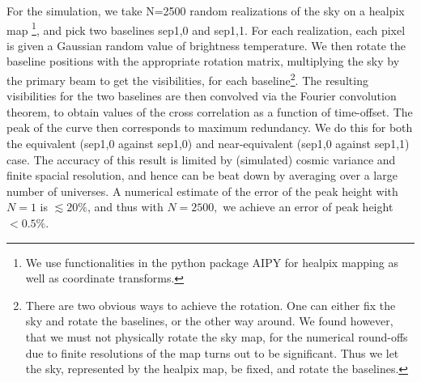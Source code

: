 \documentclass[twocolumn,apj,numberedappendix]{emulateapj}
\renewcommand\[{\begin{equation}}
\renewcommand\]{\end{equation}}
\begin{document}
For the simulation, we take N=2500 random realizations of the sky
on a healpix map \citep{Heal, HealPrimer} \footnote{We use functionalities in the python package AIPY for healpix mapping
as well as coordinate transforms. }, and pick two baselines sep1,0 and sep1,1. For each realization, each pixel is given a Gaussian random value
of brightness temperature. We then rotate the baseline positions with
the appropriate rotation matrix, multiplying the sky by the primary beam to get the visibilities, for each
baseline\footnote{There are two obvious ways to achieve the rotation. One
can either fix the sky and rotate the baselines, or the other way
around. We found however, that we must not physically rotate the sky
map, for the numerical round-offs due to finite resolutions of the
map turns out to be significant. Thus we let the sky, represented
by the healpix map, be fixed, and rotate the baselines. }. The resulting visibilities for the two baselines are then convolved
via the Fourier convolution theorem, to obtain values of the cross
correlation as a function of time-offset. The peak of the curve then
corresponds to maximum redundancy.  We do this for both the equivalent (sep1,0 against sep1,0) and near-equivalent (sep1,0 against sep1,1) case. The accuracy of this result is
limited by (simulated) cosmic variance and finite spacial resolution,
and hence can be beat down by averaging over a large number of universes.
A numerical estimate of the error of the peak height with $N=1$ is
$\lesssim20\%$, and thus with $N=2500,$ we achieve an error of peak
height $<0.5\%$. 
\end{document}
